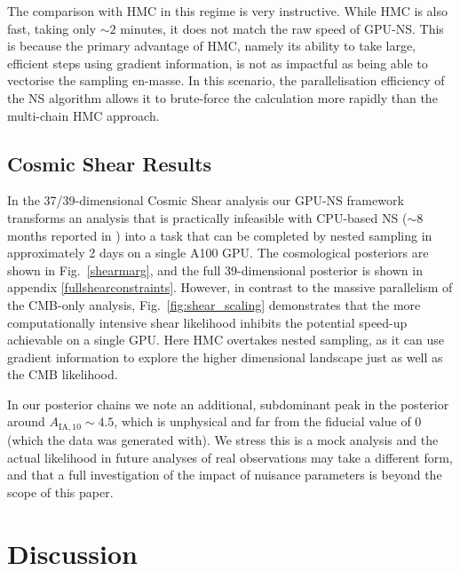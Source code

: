 \documentclass[twocolumn]{openjournal}
\begin{document}
The comparison with HMC in this regime is very instructive. While HMC is also fast, taking only $\sim2$ minutes, it does not match the raw speed of GPU-NS. This is because the primary advantage of HMC, namely its ability to take large, efficient steps using gradient information, is not as impactful as being able to vectorise the sampling en-masse. In this scenario, the parallelisation efficiency of the NS algorithm allows it to brute-force the calculation more rapidly than the multi-chain HMC approach.

\subsection{Cosmic Shear Results}
In the 37/39-dimensional Cosmic Shear analysis our GPU-NS framework transforms an analysis that is practically infeasible with CPU-based NS ($\sim$8 months reported in \citealp{Piras_2024}) into a task that can be completed by nested sampling in approximately 2 days on a single A100 GPU. The cosmological posteriors are shown in Fig.~\ref{shearmarg}, and the full 39-dimensional posterior is shown in appendix \ref{fullshearconstraints}. However, in contrast to the massive parallelism of the CMB-only analysis, Fig.~\ref{fig:shear_scaling} demonstrates that the more computationally intensive shear likelihood inhibits the potential speed-up achievable on a single GPU. Here HMC overtakes nested sampling, as it can use gradient information to explore the higher dimensional landscape just as well as the CMB likelihood.

In our posterior chains we note an additional, subdominant peak in the posterior around $A_{\text{IA},10} \sim 4.5$, which is unphysical and far from the fiducial value of $0$ (which the data was generated with). We stress this is a mock analysis and the actual likelihood in future analyses of real observations may take a different form, and that a full investigation of the impact of nuisance parameters is beyond the scope of this paper.

\section{Discussion}
\label{sec:discussion}
\end{document}
